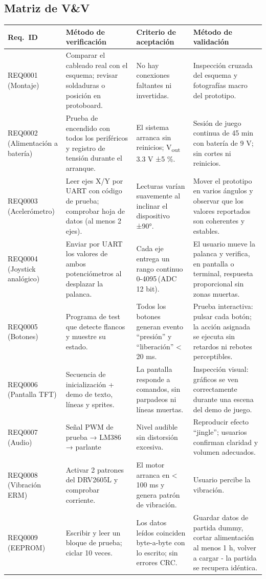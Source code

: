 \documentclass[11pt,a4paper]{article}
\begin{document}
\subsection{Matriz de V\&V}
\begin{longtable}{|p{2cm}|p{5.3cm}|p{4.7cm}|p{4.7cm}|}
\hline
\rowcolor[HTML]{C0C0C0}
\textbf{Req.\ ID} &
\textbf{Método de verificación} &
\textbf{Criterio de aceptación} &
\textbf{Método de validación} \\ \hline
REQ0001 (Montaje) &
Comparar el cableado real con el esquema; revisar soldaduras
o posición en protoboard. &
No hay conexiones faltantes ni invertidas. &
Inspección cruzada del esquema y fotografías macro del
prototipo. \\ \hline
REQ0002 (Alimentación a batería) &
Prueba de encendido con todos los
periféricos y registro de tensión durante
el arranque. &
El sistema arranca sin reinicios; V\textsubscript{out}
3.3 V ±5 \%. &
Sesión de juego continua de
45 min con batería de 9 V;
sin cortes ni reinicios. \\ \hline
REQ0003 (Acelerómetro) &
Leer ejes X/Y por UART con código de prueba;
comprobar hoja de datos (al menos 2 ejes). &
Lecturas varían suavemente al inclinar
el dispositivo ±90°. &
Mover el prototipo en varios
ángulos y observar que los
valores reportados son coherentes y estables. \\ \hline
REQ0004 (Joystick analógico) &
Enviar por UART los valores de ambos
potenciómetros al desplazar la palanca. &
Cada eje entrega un rango continuo
0-4095\,(ADC 12 bit). &
El usuario mueve la palanca y
verifica, en pantalla o terminal,
respuesta proporcional sin zonas muertas. \\ \hline
REQ0005 (Botones) &
Programa de test que detecte flancos
y muestre su estado. &
Todos los botones generan evento
“presión” y “liberación” < 20 ms. &
Prueba interactiva: pulsar
cada botón; la acción asignada
se ejecuta sin retardos ni rebotes
perceptibles. \\ \hline
REQ0006 (Pantalla TFT) &
Secuencia de inicialización + demo
de texto, líneas y sprites. &
La pantalla responde a comandos,
sin parpadeos ni líneas muertas. &
Inspección visual: gráficos se ven
correctamente durante una escena del
demo de juego. \\ \hline
REQ0007 (Audio) &
Señal PWM de prueba → LM386 →
parlante &
Nivel audible sin distorsión
excesiva. &
Reproducir efecto “jingle”;
usuarios confirman claridad y volumen adecuados. \\ \hline
REQ0008 (Vibración ERM) &
Activar 2 patrones del DRV2605L
y comprobar corriente. &
El motor arranca en < 100 ms y
genera patrón de vibración. &
Usuario percibe la vibración. \\ \hline
REQ0009 (EEPROM) &
Escribir y leer un bloque de prueba;
ciclar 10 veces. &
Los datos leídos coinciden byte-a-byte
con lo escrito; sin errores CRC. &
Guardar datos de partida dummy, cortar
alimentación al menos 1 h, volver a
cargar - la partida se recupera idéntica. \\ \hline
\end{longtable}
\end{document}
